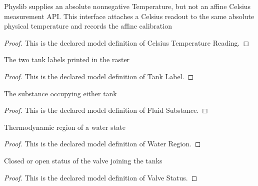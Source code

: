 \begin{definition}
  \label{def:physics:phyx-mini-0397:phyxminiproblems-problemphyxmini0397-celsiustemperaturereading}
  Physlib supplies an absolute nonnegative Temperature, but not an affine Celsius measurement API. This interface attaches a Celsius readout to the same absolute physical temperature and records the affine calibration
\end{definition}
\begin{proof}
  This is the declared model definition of Celsius Temperature Reading.
\end{proof}
\begin{definition}
  \label{def:physics:phyx-mini-0397:phyxminiproblems-problemphyxmini0397-tanklabel}
  The two tank labels printed in the raster
\end{definition}
\begin{proof}
  This is the declared model definition of Tank Label.
\end{proof}
\begin{definition}
  \label{def:physics:phyx-mini-0397:phyxminiproblems-problemphyxmini0397-fluidsubstance}
  The substance occupying either tank
\end{definition}
\begin{proof}
  This is the declared model definition of Fluid Substance.
\end{proof}
\begin{definition}
  \label{def:physics:phyx-mini-0397:phyxminiproblems-problemphyxmini0397-waterregion}
  Thermodynamic region of a water state
\end{definition}
\begin{proof}
  This is the declared model definition of Water Region.
\end{proof}
\begin{definition}
  \label{def:physics:phyx-mini-0397:phyxminiproblems-problemphyxmini0397-valvestatus}
  Closed or open status of the valve joining the tanks
\end{definition}
\begin{proof}
  This is the declared model definition of Valve Status.
\end{proof}
